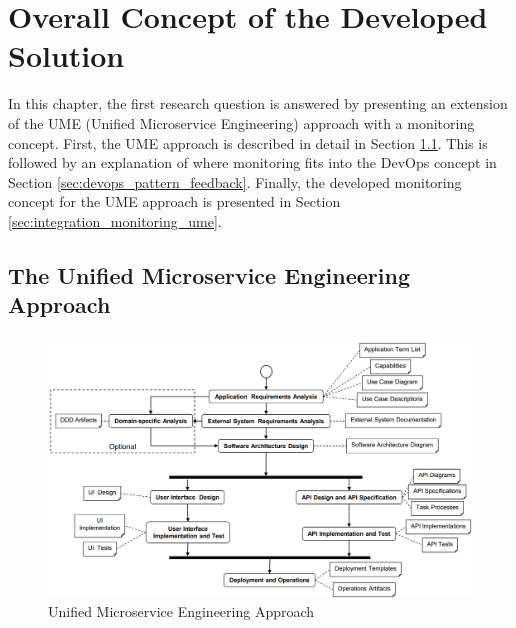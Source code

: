 \chapter{Overall Concept of the Developed Solution}
\label{cha:concept}

In this chapter, the first research question is answered by presenting an extension
of the UME (Unified Microservice Engineering) approach with a monitoring concept.
First, the UME approach is described in detail in Section \ref{sec:ume_approach}.
This is followed by an explanation of where monitoring fits into the DevOps concept
in Section \ref{sec:devops_pattern_feedback}.
Finally, the developed monitoring concept for the UME approach is presented
in Section \ref{sec:integration_monitoring_ume}.

\section{The Unified Microservice Engineering Approach}
\label{sec:ume_approach}

\begin{figure}[tb]
	\centering
	\includegraphics[width=\textwidth]{figures/4.1_ume_approach.png}
	\caption{Unified Microservice Engineering Approach \cite{CM-W-OVW}}
	\label{fig:ume_approach}
\end{figure}

